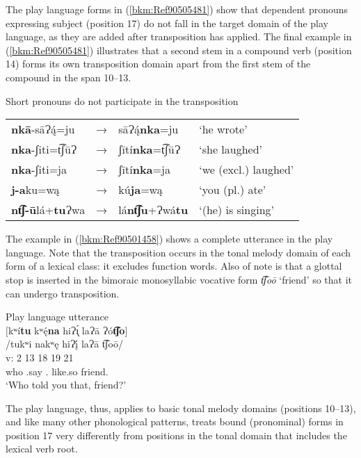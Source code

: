 \documentclass[output=paper]{langscibook}
\begin{document}
The play language forms in (\ref{bkm:Ref90505481}) show that dependent pronouns expressing subject (position 17) do not fall in the target domain of the play language, as they are added after transposition has applied. The final example in (\ref{bkm:Ref90505481}) illustrates that a second stem in a compound verb (position 14) forms its own transposition domain apart from the first stem of the compound in the span 10{}--13.


\ea\label{bkm:Ref90505481}Short pronouns do not participate in the transposition\\
\begin{tabular}{llll}
\textbf{nkā}{}-sāɁą́=ju & → & sāɁą́\textbf{nka}=ju & `he wrote'\\
\textbf{nka}{}-ʃiti=t͡ʃūɁ & → & ʃītí\textbf{nka}=t͡ʃūɁ & `she laughed'\\
\textbf{nka}{}-ʃiti=ja & → & ʃītí\textbf{nka}=ja & `we (excl.) laughed'\\
\textbf{j-a}ku=wą & → & kú\textbf{ja}=wą & `you (pl.) ate'\\
\textbf{nt͡ʃ-ū}lá+\textbf{tu}Ɂwa & → & lá\textbf{nt͡ʃu}+Ɂwá\textbf{tu} & `(he) is singing'\\
\end{tabular}
\z 


The example in (\ref{bkm:Ref90501458}) shows a complete utterance in the play language. Note that the transposition occurs in the tonal melody domain of each form of a lexical class: it excludes function words. Also of note is that a glottal stop is inserted in the bimoraic monosyllabic vocative form \textit{t͡ʃoō} `friend' so that it can undergo transposition.


\ea\label{bkm:Ref90501458}Play language utterance\\
$[$kʷí\textbf{\textup{tu}} \textup{kʷę́}\textbf{\textup{na}} \textup{hiɁ\'{\k{ı}} laɁā Ɂó}\textbf{t͡ʃo}$]$\\
    \glll {} /tukʷi nakʷę hiɁį́ laɁā t͡ʃoō/\\
    v: 2 13 18 19 21 \\ 
    {} who \Pfv{}.say \Dat{}.\Second\Sg{} like.so friend.\Voc{}\\
    \glt `Who told you that, friend?'
\z

The play language, thus, applies to basic tonal melody domains (positions 10{}--13), and like many other phonological patterns, treats bound (pronominal) forms in position 17 very differently from positions in the tonal domain that includes the lexical verb root.
\end{document}
